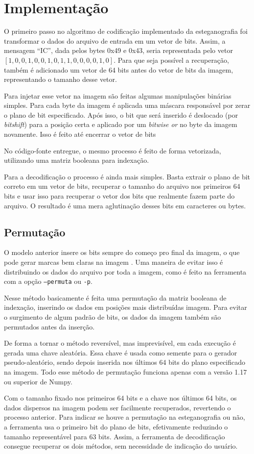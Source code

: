 \section{Implementação} \label{sec:implementacao}

O primeiro passo no algoritmo de codificação implementado da esteganografia foi transformar o dados do arquivo de entrada em um vetor de bits. Assim, a mensagem ``IC'', dada pelos bytes 0x49 e 0x43, seria representada pelo vetor $[1, 0, 0, 1, 0, 0, 1, 0, 1, 1, 0, 0, 0, 0, 1, 0]$. Para que seja possível a recuperação, também é adicionado um vetor de 64 bits antes do vetor de bits da imagem, representando o tamanho desse vetor.

Para injetar esse vetor na imagem são feitas algumas manipulações binárias simples. Para cada byte da imagem é aplicada uma máscara responsável por zerar o plano de bit especificado. Após isso, o bit que será inserido é deslocado (por \textit{bitshift}) para a posição certa e aplicado por um \textit{bitwise or} no byte da imagem novamente. Isso é feito até encerrar o vetor de bits

No código-fonte entregue, o mesmo processo é feito de forma vetorizada, utilizando uma matriz booleana para indexação.

Para a decodificação o processo é ainda mais simples. Basta extrair o plano de bit correto em um vetor de bits, recuperar o tamanho do arquivo nos primeiros 64 bits e usar isso para recuperar o vetor dos bits que realmente fazem parte do arquivo. O resultado é uma mera aglutinação desses bits em caracteres ou bytes.

\subsection{Permutação} \label{sec:permutacao}

O modelo anterior insere os bits sempre do começo pro final da imagem, o que pode gerar marcas bem claras na imagem . Uma maneira de evitar isso é distribuindo os dados do arquivo por toda a imagem, como é feito na ferramenta com a opção \texttt{--permuta} ou \texttt{-p}.

Nesse método basicamente é feita uma permutação da matriz booleana de indexação, inserindo os dados em posições mais distribuídas  imagem. Para evitar o surgimento de algum padrão de bits, os dados da imagem também são permutados antes da inserção.

De forma a tornar o método reversível, mas imprevisível, em cada execução é gerada uma chave aleatória. Essa chave é usada como semente para o gerador pseudo-aleatório, sendo depois inserida nos últimos 64 bits do plano especificado na imagem. Todo esse método de permutação funciona apenas com a versão 1.17 ou superior de Numpy.

Com o tamanho fixado nos primeiros 64 bits e a chave nos últimos 64 bits, os dados dispersos na imagem podem ser facilmente recuperados, revertendo o processo anterior. Para indicar se houve a permutação na esteganografia ou não, a ferramenta usa o primeiro bit do plano de bits, efetivamente reduzindo o tamanho representável para 63 bits. Assim, a ferramenta de decodificação consegue recuperar os dois métodos, sem necessidade de indicação do usuário.
